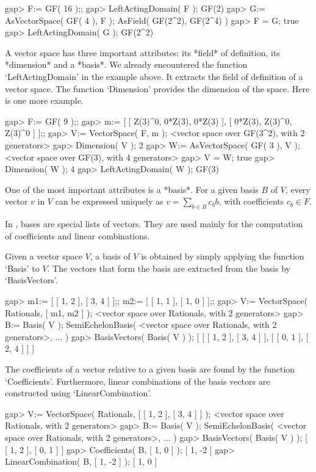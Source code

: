 \beginexample
gap> F:= GF( 16 );;
gap> LeftActingDomain( F );
GF(2)
gap> G:= AsVectorSpace( GF( 4 ), F );
AsField( GF(2^2), GF(2^4) )
gap> F = G;
true
gap> LeftActingDomain( G );
GF(2^2)
\endexample

A vector space has three important attributes: its *field* of definition,
its *dimension* and a *basis*. We already encountered the function 
`LeftActingDomain' in the example above. It extracts the field of definition
of a vector space.
The function `Dimension' provides the dimension of the space.
Here is one more example.

\beginexample
gap> F:= GF( 9 );;
gap> m:= [ [ Z(3)^0, 0*Z(3), 0*Z(3) ], [ 0*Z(3), Z(3)^0, Z(3)^0 ] ];;
gap> V:= VectorSpace( F, m );
<vector space over GF(3^2), with 2 generators>
gap> Dimension( V );
2
gap> W:= AsVectorSpace( GF( 3 ), V );
<vector space over GF(3), with 4 generators>
gap> V = W;
true
gap> Dimension( W );
4
gap> LeftActingDomain( W );
GF(3)
\endexample

One of the most important attributes is a *basis*. For a given basis $B$ of 
$V$, every vector $v$ in $V$ can be expressed uniquely as 
$v = \sum_{b \in B} c_b b$, with coefficients $c_b \in F$.

In {\GAP}, bases are special lists of vectors.
They are used mainly for the computation of coefficients and linear
combinations. 

Given a vector space $V$, a basis of $V$ is obtained by
simply applying the function `Basis' to $V$. The vectors that form
the basis are extracted from the basis by `BasisVectors'. 

\beginexample
gap> m1:= [ [ 1, 2 ], [ 3, 4 ] ];; m2:= [ [ 1, 1 ], [ 1, 0 ] ];;
gap> V:= VectorSpace( Rationals, [ m1, m2 ] );
<vector space over Rationals, with 2 generators>
gap> B:= Basis( V );
SemiEchelonBasis( <vector space over Rationals, with 2 generators>, ... )
gap> BasisVectors( Basis( V ) );
[ [ [ 1, 2 ], [ 3, 4 ] ], [ [ 0, 1 ], [ 2, 4 ] ] ]
\endexample

The coefficients of 
a vector relative to a given basis are found by the function
`Coefficients'. Furthermore, linear combinations of the basis vectors
are constructed using `LinearCombination'.

\beginexample
gap> V:= VectorSpace( Rationals, [ [ 1, 2 ], [ 3, 4 ] ] );
<vector space over Rationals, with 2 generators>
gap> B:= Basis( V );
SemiEchelonBasis( <vector space over Rationals, with 2 generators>, ... )
gap> BasisVectors( Basis( V ) );
[ [ 1, 2 ], [ 0, 1 ] ]
gap> Coefficients( B, [ 1, 0 ] );
[ 1, -2 ]
gap> LinearCombination( B, [ 1, -2 ] );
[ 1, 0 ]
\endexample

